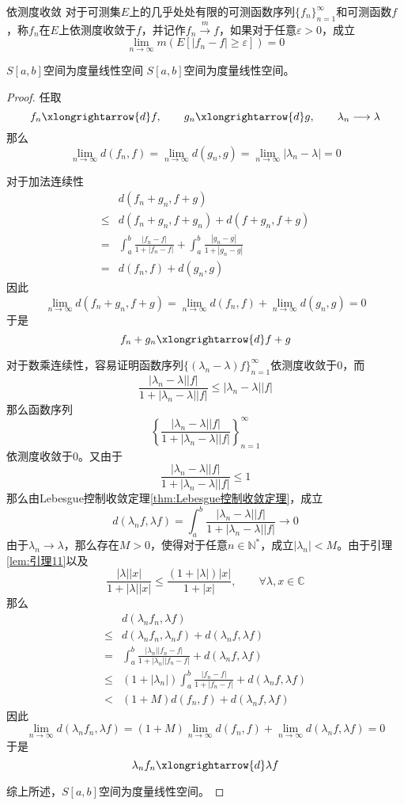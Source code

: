 \documentclass[lang = cn, scheme = chinese, thmcnt = section]{elegantbook}
\newcommand{\N}{\mathbb{N}}            %
\newcommand{\C}{\mathbb{C}}  		   %
\begin{document}
\begin{definition}{依测度收敛}
	对于可测集$E$上的几乎处处有限的可测函数序列$\{f_n\}_{n=1}^{\infty}$和可测函数$f$，称$f_n$在$E$上依测度收敛于$f$，并记作$f_n\xrightarrow{m} f$，如果对于任意$\varepsilon>0$，成立
	$$
	\lim_{n\to\infty}m(E[|f_n-f|\ge\varepsilon])=0
	$$
\end{definition}

\begin{proposition}{$S[a,b]$空间为度量线性空间}
	$S[a,b]$空间为度量线性空间。
\end{proposition}

\begin{proof}
	任取
	$$
	f_n\xlongrightarrow{d} f,\qquad 
	g_n\xlongrightarrow{d} g,\qquad 
	\lambda_n\longrightarrow \lambda
	$$
	那么
	$$
	\lim_{n\to\infty}d(f_n,f)=
	\lim_{n\to\infty}d(g_n,g)= 
	\lim_{n\to\infty}|\lambda_n-\lambda|=0
	$$
	
	对于加法连续性
	$$
	\begin{align*}
		& d(f_n+g_n,f+g)\\
		\le &   d(f_n+g_n,f+g_n)+
		d(f+g_n,f+g)\\
		= & \int_a^b\frac{|f_n-f|}{1+|f_n-f|}+\int_a^b\frac{|g_n-g|}{1+|g_n-g|}\\
		= & d(f_n,f)+d(g_n,g)
	\end{align*}
	$$
	因此
	$$
	\lim_{n\to\infty}d(f_n+g_n,f+g)=
	\lim_{n\to\infty}d(f_n,f)+
	\lim_{n\to\infty}d(g_n,g)=0
	$$
	于是
	$$
	f_n+g_n\xlongrightarrow{d} f+g
	$$
	
	对于数乘连续性，容易证明函数序列$\{ (\lambda_n-\lambda)f \}_{n=1}^{\infty}$依测度收敛于$0$，而
	$$
	\frac{|\lambda_n-\lambda||f|}{1+|\lambda_n-\lambda||f|}\le |\lambda_n-\lambda||f|
	$$
	那么函数序列
	$$
	\left\{ \frac{|\lambda_n-\lambda||f|}{1+|\lambda_n-\lambda||f|} \right\}_{n=1}^{\infty}
	$$
	依测度收敛于$0$。又由于
	$$
	\frac{|\lambda_n-\lambda||f|}{1+|\lambda_n-\lambda||f|}\le 1
	$$
	那么由Lebesgue控制收敛定理\ref{thm:Lebesgue控制收敛定理}，成立
	$$
	d(\lambda_nf,\lambda f)=\int_a^b\frac{|\lambda_n-\lambda||f|}{1+|\lambda_n-\lambda||f|}\to0
	$$
	由于$\lambda_n\to\lambda$，那么存在$M>0$，使得对于任意$n\in\N^*$，成立$|\lambda_n|< M$。由于引理\ref{lem:引理11}以及
	$$
	\frac{|\lambda||x|}{1+|\lambda||x|}\le \frac{(1+|\lambda|)|x|}{1+|x|},\qquad \forall \lambda,x\in\C
	$$
	那么
	\begin{align*}
		& d(\lambda_n f_n,\lambda f)\\
		\le &  d(\lambda_n f_n,\lambda_n f)+
		d(\lambda_n f,\lambda f)\\
		= & \int_a^b\frac{|\lambda_n||f_n-f|}{1+|\lambda_n||f_n-f|}+d(\lambda_n f,\lambda f)\\
		\le & (1+|\lambda_n|)\int_a^b\frac{|f_n-f|}{1+|f_n-f|}+d(\lambda_n f,\lambda f)\\
		< & (1+M)d(f_n,f)+d(\lambda_n f,\lambda f)
	\end{align*}
	因此
	$$
	\lim_{n\to\infty}d(\lambda_n f_n,\lambda f)
	=(1+M)\lim_{n\to\infty}d(f_n,f)+\lim_{n\to\infty}d(\lambda_n f,\lambda f)=0
	$$
	于是
	$$
	\lambda_n f_n\xlongrightarrow{d}\lambda f
	$$
	
	综上所述，$S[a,b]$空间为度量线性空间。
\end{proof}
\end{document}
